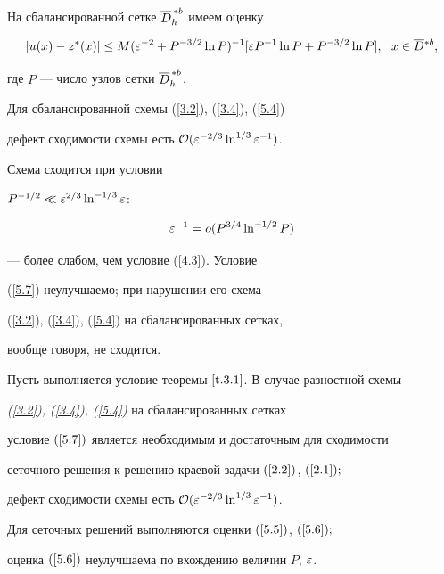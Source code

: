 На сбалансированной сетке $\overline{D}_h^{\,*b}$ имеем оценку


\begin{equation} \label{5.6}


|u(x)-z^*(x)|\le M(\eps^{-2}+


P^{-3/2}\ln P)^{-1}[


\eps P^{-1}\ln P + P^{-3/2}\ln P],


\ \ x\in \Db{}^{*b},


\end{equation}


где $P$ --- число узлов сетки $\overline{D}_h^{\,*b}$.


Для сбалансированной схемы (\ref{3.2}), (\ref{3.4}), (\ref{5.4})


дефект сходимости схемы есть ${\cal O} (\varepsilon^{-2/3}\ln^{1/3}\varepsilon^{-1})$.


Схема сходится при условии 


$P^{-1/2} \ll \varepsilon^{2/3}\ln^{-1/3}\varepsilon$:


\begin{equation} \label{5.7}


\eps^{-1}=o(P^{3/4}\ln^{-1/2}P)


\end{equation}


--- более слабом, чем условие (\ref{4.3}). Условие


(\ref{5.7}) неулучшаемо; при нарушении его схема


(\ref{3.2}), (\ref{3.4}), (\ref{5.4}) на сбалансированных сетках,


вообще говоря, не сходится.





\begin{thms} \label{t.5.1}


Пусть выполняется условие теоремы $\ref{t.3.1}$. В случае разностной схемы


{\em (\ref{3.2}), (\ref{3.4}), (\ref{5.4})} на сбалансированных сетках


условие $(\ref{5.7})$ является необходимым и достаточным для сходимости


сеточного решения к решению краевой задачи $(\ref{2.2})$, $(\ref{2.1});$


дефект сходимости схемы есть ${\cal O} (\varepsilon^{-2/3}\ln^{1/3}\varepsilon^{-1})$.


Для сеточных решений выполняются оценки $(\ref{5.5})$, $(\ref{5.6});$


оценка $(\ref{5.6})$ неулучшаема по вхождению величин $P$, $\varepsilon$.


\end{thms}





